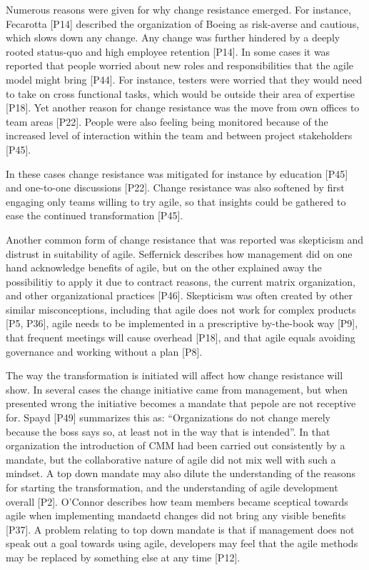 \documentclass[preprint,authoryear,12pt]{elsarticle}
\begin{document}
Numerous reasons were given for why change resistance emerged. For
instance, Fecarotta [P14] described the organization of Boeing as risk-averse
and cautious, which slows down any change. Any change was further hindered by a
deeply rooted status-quo and high employee retention [P14]. In some cases it was
reported that people worried about new roles and responsibilities that the agile
model might bring [P44]. For instance, testers were worried that they would need
to take on cross functional tasks, which would be outside their area of
expertise [P18]. Yet another reason for change resistance was the move from own
offices to team areas [P22]. People were also feeling being monitored because of
the increased level of interaction within the team and between project
stakeholders [P45].

In these cases change resistance was mitigated for instance by education [P45]
and one-to-one discussions [P22]. Change resistance was also softened by first
engaging only teams willing to try agile, so that insights could be gathered to
ease the continued transformation [P45].

Another common form of change resistance that was reported was skepticism and
distrust in suitability of agile. Seffernick describes how management did on one hand
acknowledge benefits of agile, but on the other explained away the possibilitiy
to apply it due to contract reasons, the current matrix organization, and other
organizational practices [P46]. Skepticism was often created by other similar
misconceptions, including that agile does not work for complex products [P5,
P36], agile needs to be implemented in a prescriptive by-the-book way [P9], that
frequent meetings will cause overhead [P18], and that agile equals avoiding
governance and working without a plan [P8].




The way the transformation is initiated will affect how change resistance will
show. In several cases the change initiative came from management, but when
presented wrong the initiative becomes a mandate that pepole are not receptive
for. Spayd [P49] summarizes this as: ``Organizations do not change merely
because the boss says so, at least not in the way that is intended''. In that
organization the introduction of CMM had been carried out consistently by a
mandate, but the collaborative nature of agile did not mix well with such a
mindset. A top down mandate may also dilute the understanding of the reasons for
starting the transformation, and the understanding of agile development overall
[P2]. O'Connor describes how team members became sceptical towards agile when
implementing mandaetd changes did not bring any visible benefits [P37].
A problem relating to top down mandate is that if management does not speak out
a goal towards using agile, developers may feel that the agile methods may be
replaced by something else at any time [P12].
\end{document}
